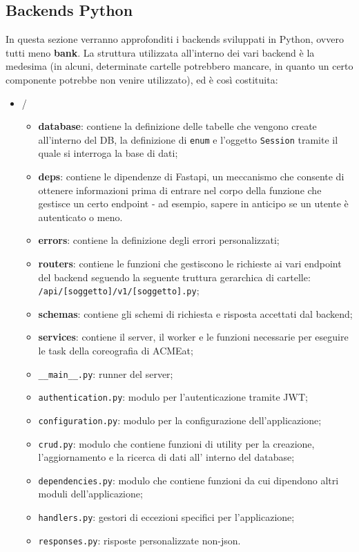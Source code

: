 \documentclass[11pt]{article} %
\begin{document}
\subsection{Backends Python}

In questa sezione verranno approfonditi i backends sviluppati in Python, ovvero tutti meno \textbf{bank}. La struttura utilizzata all'interno dei vari backend è la medesima (in alcuni, determinate cartelle potrebbero mancare, in quanto un certo componente potrebbe non venire utilizzato), ed è così costituita:
\begin{itemize}
\item /
\begin{itemize}
\item \textbf{database}: contiene la definizione delle tabelle che vengono create all'interno del DB, la definizione di \verb|enum| e l'oggetto \verb|Session| tramite il quale si interroga la base di dati;
\item \textbf{deps}: contiene le dipendenze di Fastapi, un meccanismo che consente di ottenere informazioni prima di entrare nel corpo della funzione che gestisce un certo endpoint - ad esempio, sapere in anticipo se un utente è autenticato o meno.
\item \textbf{errors}: contiene la definizione degli errori personalizzati;
\item \textbf{routers}: contiene le funzioni che gestiscono le richieste ai vari endpoint del backend seguendo la seguente truttura gerarchica di cartelle:\\ \verb|/api/[soggetto]/v1/[soggetto].py|;
\item \textbf{schemas}: contiene gli schemi di richiesta e risposta accettati dal backend;
\item \textbf{services}: contiene il server, il worker e le funzioni necessarie per eseguire le task della coreografia di ACMEat;
\item \verb|__main__.py|: runner del server;
\item \verb|authentication.py|: modulo per l'autenticazione tramite JWT;
\item \verb|configuration.py|: modulo per la configurazione dell'applicazione;
\item \verb|crud.py|: modulo che contiene funzioni di utility per la creazione, l'aggiornamento e la ricerca di dati all' interno del database;
\item \verb|dependencies.py|: modulo che contiene funzioni da cui dipendono altri moduli dell'applicazione;
\item \verb|handlers.py|: gestori di eccezioni specifici per l'applicazione;
\item \verb|responses.py|: risposte personalizzate non-json.
\end{itemize}
\end{itemize}
\end{document}
